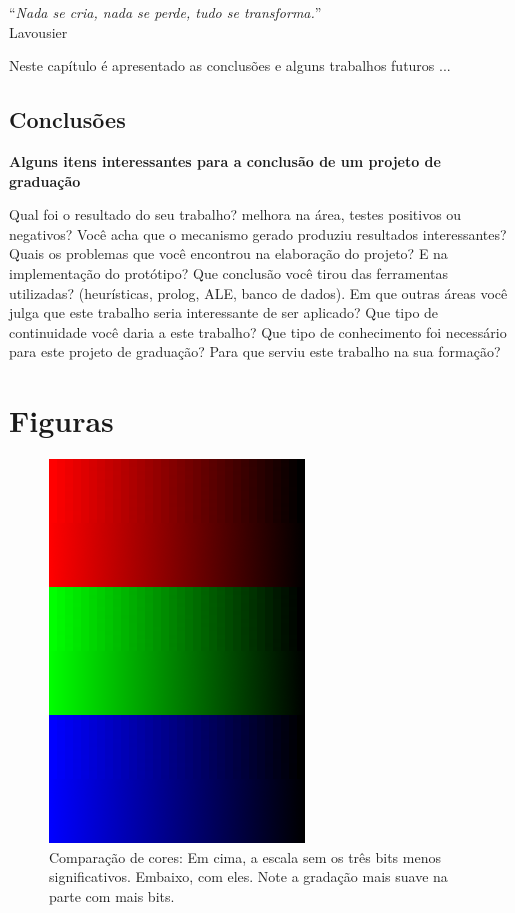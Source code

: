\documentclass[brazil]{abnt}
\begin{document}
\vfill{}
\begin{flushright}{}``\emph{Nada se cria, nada se perde, tudo se
transforma.}''\\
{\small Lavousier}\end{flushright}{\small \par}
\vfill{}

Neste capítulo é apresentado as conclusões e alguns trabalhos futuros
...
\newpage


\section{Conclusões}

{\bf Alguns itens interessantes para a conclusão de um projeto de graduação}

Qual foi o resultado do seu trabalho? melhora na área, testes positivos ou negativos?
Você acha que o mecanismo gerado produziu resultados interessantes?
Quais os problemas que você encontrou na elaboração do projeto?
E na implementação do protótipo?
Que conclusão você tirou das ferramentas utilizadas? (heurísticas, prolog, ALE, banco de dados).
Em que outras áreas você julga que este trabalho seria interessante de ser aplicado?
Que tipo de continuidade você daria a este trabalho?
Que tipo de conhecimento foi necessário para este projeto de graduação?
Para que serviu este trabalho na sua formação?






\anexo

\chapter{Figuras}

\begin{figure}[h]
\centering
\includegraphics{imgs/diferenca_cor.png}
\caption[Comparação de cores]{Comparação de cores: Em cima, a escala sem os três bits menos significativos. Embaixo, com eles. Note a gradação mais suave na parte com mais bits.}
\label{img:comparacao} 
\end{figure}
\end{document}
